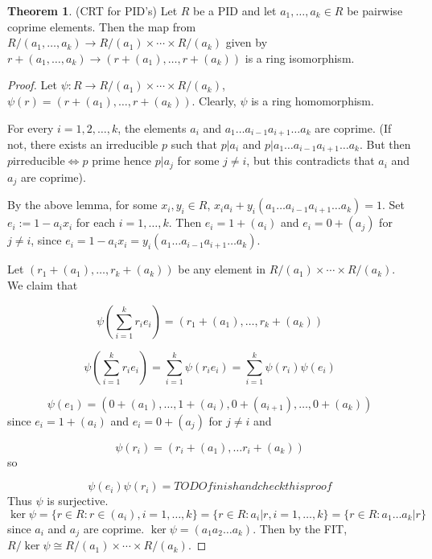 \documentclass[12pt,a4paper]{article}
\theoremstyle{definition}
\newtheorem{theorem}[definition]{Theorem}
\begin{document}
\begin{theorem}
	(CRT for PID's) Let $R$ be a PID and let $a_1, \ldots, a_k \in R$ be pairwise coprime elements. Then the map from $R / (a_1, \ldots, a_k) \rightarrow R / (a_1) \times \cdots \times R / (a_k)$ given by $r + (a_1, \dots, a_k) \rightarrow (r + (a_1), \dots, r + (a_k))$ is a ring isomorphism.
\end{theorem}

\begin{proof}
	Let $\psi: R \rightarrow R / (a_1) \times \cdots \times R / (a_k)$, $\psi(r) = (r + (a_1), \dots, r + (a_k))$. Clearly, $\psi$ is a ring homomorphism. 
	
	For every $i = 1, 2, \dots, k$, the elements $a_i$ and $a_1 \dots a_{i - 1} a_{i + 1} \dots a_k$ are coprime. (If not, there exists an irreducible $p$ such that $p | a_i$ and $p | a_1 \dots a_{i - 1} a_{i + 1} \dots a_k$. But then $p \text{irreducible} \Leftrightarrow p \text{ prime}$ hence $p | a_j$ for some $j \ne i$, but this contradicts that $a_i$ and $a_j$ are coprime).

	By the above lemma, for some $x_i, y_i \in R$, $x_i a_i + y_i (a_1 \dots a_{i - 1} a_{i + 1} \dots a_k) = 1$. Set $e_i := 1 - a_i x_i$ for each $i = 1, \dots, k$. Then $e_i = 1 + (a_i)$ and $e_i = 0 + (a_j)$ for $j \ne i$, since $e_i = 1 - a_i x_i = y_i (a_1 \dots a_{i - 1} a_{i + 1} \dots a_k)$.

	Let $(r_1 + (a_1), \dots, r_k + (a_k))$ be any element in $R / (a_1) \times \cdots \times R / (a_k)$. We claim that

	\[ \psi \left( \sum_{i = 1}^k r_i e_i \right) = (r_1 + (a_1), \dots, r_k + (a_k)) \]

	\[ \psi \left( \sum_{i = 1}^k r_i e_i \right) = \sum_{i = 1}^k \psi(r_i e_i) = \sum_{i = 1}^k \psi(r_i) \psi(e_i) \]

	\[ \psi(e_1) = (0 + (a_1), \dots, 1 + (a_i), 0 + (a_{i + 1}), \dots, 0 + (a_k)) \]
	since $e_i = 1 + (a_i)$ and $e_i = 0 + (a_j)$ for $j \ne i$ and

	\[ \psi(r_i) = (r_i + (a_1), \dots r_i + (a_k)) \] so

	\[ \psi(e_i) \psi(r_i) = TODO finish and check this proof \]
	Thus $\psi$ is surjective.
	$\ker \psi = \{ r \in R: r \in (a_i), i = 1, \dots, k \} = \{ r \in R: a_i | r, i = 1, \dots, k \} = \{ r \in R: a_1 \dots a_k | r \}$ since $a_i$ and $a_j$ are coprime.
	$\ker \psi = (a_1 a_2 \dots a_k)$. Then by the FIT, $R / \ker \psi \cong R / (a_1) \times \cdots \times R / (a_k)$.
\end{proof}
\end{document}
